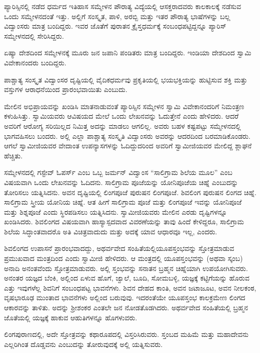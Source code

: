  ಪ್ಯಾರಿಸ್ಸಿನಲ್ಲಿ ನಡೆದ ಧರ್ಮದ ಇತಿಹಾಸ ಸಮ್ಮೇಳನ ಪೌರಾತ್ಯ ವಿದ್ಯೆಯಲ್ಲಿ ಆಸಕ್ತರಾದವರು ಕಾಲಕಾಲಕ್ಕೆ ನಡೆಸುವ ಒಂದು ಸಮ್ಮೇಳನದಂತೆ ಇತ್ತು. ಅಲ್ಲಿಗೆ ಸಂಸ್ಕೃತ, ಪಾಳಿ, ಅರಬ್ಬಿ ಮತ್ತು ಇತರ ಪೌರಾತ್ಯ ಭಾಷೆಗಳನ್ನು ಬಲ್ಲ ವಿದ್ವಾಂಸರು ಮಾತ್ರ ಬಂದಿದ್ದರು. ಇವರ ಜೊತೆಗೆ ಪುರಾತನ ಕ್ರೈಸ್ತಧರ್ಮಕ್ಕೆ ಸಂಬಂಧಪಟ್ಟಿದ್ದನ್ನೂ ಪ್ಯಾರಿಸ್ ಸಮ್ಮೇಳನದಲ್ಲಿ ಸೇರಿಸಿದ್ದರು. 

 ಏಷ್ಯಾ ದೇಶದಿಂದ ಸಮ್ಮೇಳನಕ್ಕೆ ಮೂರು ಜನ ಜಪಾನಿ ಪಂಡಿತರು ಮಾತ್ರ ಬಂದಿದ್ದರು. ಇಂಡಿಯಾ ದೇಶದಿಂದ ಸ್ವಾಮಿ ವಿವೇಕಾನಂದರು ಬಂದಿದ್ದರು. 

 ಪಾಶ್ಚಾತ್ಯ ಸಂಸ್ಕೃತ ವಿದ್ವಾಂಸರ ದೃಷ್ಟಿಯಲ್ಲಿ ವೈದಿಕಧರ್ಮವು ಪ್ರಕೃತಿಯಲ್ಲಿ ಭಯಭಕ್ತಿಯನ್ನು ಹುಟ್ಟಿಸುವ ಶಕ್ತಿ ಮತ್ತು ವಸ್ತುಗಳ ಆರಾಧನೆಯಿಂದ ಪ್ರಾರಂಭವಾಯಿತು ಎಂಬುದು. 

 ಮೇಲಿನ ಅಭಿಪ್ರಾಯವನ್ನು ಖಂಡಿಸಿ ಮಾತನಾಡುವಂತೆ ಪ್ಯಾರಿಸ್ಸಿನ ಸಮ್ಮೇಳನ ಸ್ವಾಮಿ ವಿವೇಕಾನಂದರಿಗೆ ನಿಮಂತ್ರಣ ಕಳುಹಿಸಿತ್ತು. ಸ್ವಾಮಿಯವರು ಆ‌ವಿಷಯದ ಮೇಲೆ ಒಂದು ಲೇಖನವನ್ನು ಓದುತ್ತೇನೆ ಎಂದು ಹೇಳಿದರು. ಆದರೆ ಅವರಿಗೆ ಆರೋಗ್ಯ ಸರಿಯಿಲ್ಲದ ನಿಮಿತ್ತ ಅದನ್ನು ಮಾಡಲು ಆಗಲಿಲ್ಲ. ಅವರು ಬಹಳ ಕಷ್ಟಪಟ್ಟು ಸಮ್ಮೇಳನದಲ್ಲಿ ಭಾಗವಹಿಸಲು ಬಂದರು. ಅಲ್ಲಿ ಎಲ್ಲಾ ಪಾಶ್ಚಾತ್ಯ ಸಂಸ್ಕೃತಿ ವಿದ್ವಾಂಸರು ಅವರನ್ನು ಆದರದಿಂದ ಬರಮಾಡಿಕೊಂಡರು. ಆಗಲೆ ಸ್ವಾಮೀಜಿಯವರ ವೇದಾಂತ ಉಪನ್ಯಾಸಗಳನ್ನು ಓದಿದ್ದುದರಿಂದ ಅವರಿಗೆ ಸ್ವಾಮೀಜಿಯವರ ಮೇಲಿದ್ದ ಶ್ಲಾಘನೆ ಹೆಚ್ಚಿತು. 

 ಸಮ್ಮೇಳನದಲ್ಲಿ ಗಸ್ಟೇವ್ ಓಪರ್ಸ್ ಎಂಬ ಒಬ್ಬ ಜರ್ಮನ್ ವಿದ್ವಾಂಸ “ಸಾಲಿಗ್ರಾಮ ಶಿಲೆಯ ಮೂಲ” ಎಂಬ ವಿಷಯವಾಗಿ ಒಂದು ಲೇಖನವನ್ನು ಓದಿದನು. ಸಾಲಿಗ್ರಾಮ ಪೂಜೆಯನ್ನು ಯೋನಿಪೂಜೆಯ ಚಿಹ್ನೆ ಎಂಬುದನ್ನು ತೋರಿಸಲು ಯತ್ನಿಸಿದನು. ಅವನ ದೃಷ್ಟಿಯಲ್ಲಿ ಲಿಂಗಪೂಜೆ ಪುರುಷನ ಲಿಂಗಪೂಜೆ. ಶಿವಲಿಂಗ ಪುರುಷನ ಲಿಂಗದ ಚಿಹ್ನೆ. ಸಾಲಿಗ್ರಾಮ ಸ್ತ್ರೀಯ ಯೋನಿಯ ಚಿಹ್ನೆ. ಆತ ಹೀಗೆ ಸಾಲಿಗ್ರಾಮ ಪೂಜೆ ಮತ್ತು ಲಿಂಗಪೂಜೆ ಇವನ್ನು ಯೋನಿಪೂಜೆ ಮತ್ತು ಶಿಶ್ನಪೂಜೆ ಎಂದು ಸ್ಥಿರಪಡಿಸಲು ಯತ್ನಿಸಿದನು. ಸ್ವಾಮೀಜಿಯವರು ಮೇಲಿನ ಎರಡು ದೃಷ್ಟಿಗಳನ್ನೂ ಖಂಡಿಸಿದರು. ಶಿವಲಿಂಗದ ವಿಷಯವಾಗಿ ಹಾಸ್ಯಾಸ್ಪದವಾದ ವಿವರಣೆಯನ್ನು ತಾವು ಹಿಂದೆ ಕೇಳಿದ್ದರೂ, ಸಾಲಿಗ್ರಾಮ ಶಿಲೆಯ ಸಿದ್ಧಾಂತವಾದರೊ ಅತಿ ವಿಚಿತ್ರವಾದುದು ಮತ್ತು ಅದಕ್ಕೆ ಯಾವ ಆಧಾರವೂ ಇಲ್ಲ, ಎಂದರು. 

 ಶಿವಲಿಂಗದ ಉಪಾಸನೆ ಪ್ರಾರಂಭವಾದದ್ದು, ಅಥರ್ವವೇದ ಸಂಹಿತೆಯಲ್ಲಿ\break ಯೂಪಸ್ತಂಭವನ್ನು ಸ್ತೋತ್ರಮಾಡುವ ಪ್ರಮುಖವಾದ ಮಂತ್ರದಿಂದ ಎಂದು ಸ್ವಾಮೀಜಿ ಹೇಳಿದರು. ಆ ಮಂತ್ರದಲ್ಲಿ ಯೂಪಸ್ತಂಭವನ್ನು (ಅಥವಾ ಸ್ಕಂಬ) ಅನಾದಿ ಅನಂತವೆಂದು ಸ್ತೋತ್ರಮಾಡುವರು. ಅಲ್ಲಿ ಸ್ತಂಭವನ್ನು ಸನಾತನ ಬ್ರಹ್ಮನ ಚಿಹ್ನೆಯಾಗಿ ಉಪಯೋಗಿಸುವರು. ಅನಂತರ ಯಜ್ಞದ ಬೆಂಕಿ, ಅಲ್ಲಿಂದ ಏಳುವ ಹೊಗೆ, ಜ್ವಾಲೆ, ಬೂದಿ, ಸೋಮಬಳ್ಳಿ, ಯಜ್ಞಕ್ಕೆ ಕಟ್ಟಿಗೆಯನ್ನು ಹೊರುವ ಎತ್ತು ಇವುಗಳೆಲ್ಲ ಶಿವನಿಗೆ ಸಂಬಂಧಪಟ್ಟ ಭಾವನೆಗಳು. ಶಿವನ ದೇಹದ ಕಾಂತಿ, ಅವನ ಜಟಾಜೂಟ, ಅವನ ನೀಲಕಂಠ, ವೃಷಭಾರೂಢ ಮುಂತಾದ ಭಾವನೆಗಳು ಅಲ್ಲಿಂದ ಬರುವುವು. ಇದರಂತೆಯೇ ಯೂಪಸ್ತಂಭ ಕಾಲಕ್ರಮೇಣ ಲಿಂಗದ ಆಕಾರವನ್ನು ತಾಳಿತು. ಅದನ್ನು ಶ‍್ರೀಶಂಕರ ಎಂತಲೇ ಜನ ನೋಡತೊಡಗಿದರು. ಅಥರ್ವವೇದ ಸಂಹಿತೆಯಲ್ಲಿ ಬ್ರಹ್ಮನ ಜೊತೆಯಲ್ಲಿ ಯಜ್ಞಕ್ಕೆ ಹಾಕುವ ಆಹುತಿಗಳನ್ನೂ ಹೊಗಳುವರು. 

 ಲಿಂಗಪುರಾಣದಲ್ಲಿ, ಅದೇ ಸ್ತೋತ್ರವನ್ನು ಕಥಾರೂಪದಲ್ಲಿ ವಿಸ್ತರಿಸಿರುವರು. ಸ್ತಂಬದ ಮಹಿಮೆ ಮತ್ತು ಮಹಾದೇವನು ಎಲ್ಲರಿಗಿಂತ ದೊಡ್ಡವನು ಎಂಬುದನ್ನು ತೋರುವುದಕ್ಕೆ ಅಲ್ಲಿ ಯತ್ನಿಸುವರು. 

